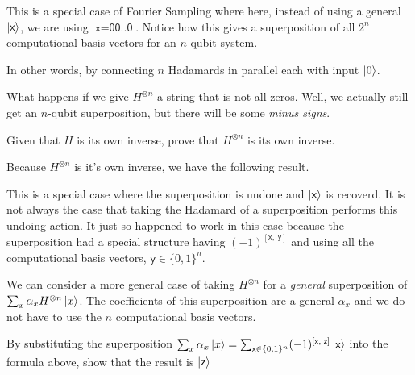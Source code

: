 \frmrule

This is a special case of Fourier Sampling where here, instead of 
using a general $\left|\textsf{x}\right\rangle$, we are using $\textsf{x} = \textsf{00..0}$. 
Notice how this gives a superposition of all $2^n$ computational basis vectors 
for an $n$ qubit system.

In other words, by connecting $n$ Hadamards in parallel each with input $\left|0\right\rangle$. 

What happens if we give $H^{\otimes n}$ a string that is not all zeros. 
Well, we actually still get an $n$-qubit superposition, but there will 
be some \textit{minus signs}.

\frmrule

\begin{example}
Given that $H$ is its own inverse, prove that $H^{\otimes n}$ is its own inverse.
\end{example}

\frmrule

Because $H^{\otimes n}$ is it's own inverse, we have the following result. 


\frmrule

This is a special case where the superposition is undone and $\left|\textsf{x}\right\rangle$ is recoverd. 
It is not always the case that taking the Hadamard of a superposition performs this undoing action. 
It just so happened to work in this case because the superposition had a 
special structure having $(-1)^{[\textsf{x}, \; \textsf{y}]}$ and using 
all the computational basis vectors, $\textsf{y} \in \{0,1\}^n$.

We can consider a more general case of taking $H^{\otimes n}$ 
for a \textit{general} superposition of $\sum_x \alpha_x H^{\otimes n} \left|x\right\rangle$. 
The coefficients of this superposition are a general $\alpha_x$ and we do not have to 
use the $n$ computational basis vectors. 


\frmrule

\begin{example}
By substituting the superposition 
$\sum_x \alpha_x \left|x\right\rangle = \sum_{\textsf{x} \in \{0,1\}^n} (-1)^{[\textsf{x}, \; \textsf{z}]}\left|\textsf{x}\right\rangle$
into the formula above, show that the result is $\left|\textsf{z}\right\rangle$
\end{example}


